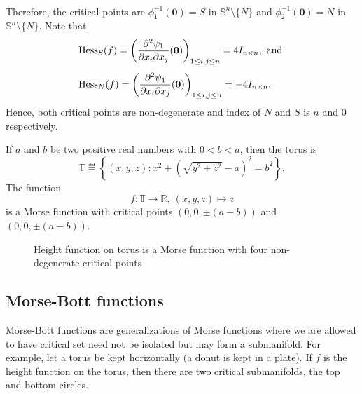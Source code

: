 \begin{eg}
\begin{align*}
    \end{align*}
    Therefore, the critical points are $\phi_1^{-1}(\mathbf{0})=S$ in $\mathbb{S}^n\setminus \{N\}$  and $\phi_2^{-1}(\mathbf{0})=N$ in $\mathbb{S}^n\setminus \{N\}$. Note that
    \begin{align*}
        & \mathrm{Hess}_S(f) = \left(\dfrac{\partial^2 \psi_1}{\partial x_i\partial x_j}(\mathbf{0})\right)_{1\le i,j\le n} = 4 I_{n\times n}, \text{ and } \\[1ex]
        & \mathrm{Hess}_N(f) = \left(\dfrac{\partial^2 \psi_1}{\partial x_i\partial x_j}(\mathbf{0})\right)_{1\le i,j\le n} = -4 I_{n\times n}.
    \end{align*}
    Hence, both critical points are non-degenerate and index of $N$ and $S$ is $n$ and $0$ respectively.
\end{eg}

\begin{eg}\label{eg:HeightFunctionOnTorus}
    If $a$ and $b$ be two positive real numbers with $0<b<a$, then the torus is
    \begin{displaymath}
        \mathbb{T} \eqdef \left\{(x,y,z):x^2+\left(\sqrt{y^2+z^2}-a\right)^2=b^2\right\}.
    \end{displaymath} 
    The function 
    \begin{displaymath}
        f:\mathbb{T}\to \mathbb{R},~(x,y,z)\mapsto z
    \end{displaymath}
    is a Morse function with critical points $(0,0,\pm(a+b))$ and $(0,0,\pm(a-b))$.
    \begin{figure}[H]
        \centering
        \caption{Height function on torus is a Morse function with four non-degenerate critical points}
        \label{fig:HeightFunctionOnTorus}
    \end{figure}
\end{eg}

\subsection{Morse-Bott functions}\label{subsec:MorseBottFunctions}
\hfb Morse-Bott functions are generalizations of Morse functions where we are allowed to have critical set need not be isolated but may form a submanifold. For example, let a torus be kept horizontally (a donut is kept in a plate). If $f$ is the height function on the torus, then there are two critical submanifolds, the top and bottom circles.

